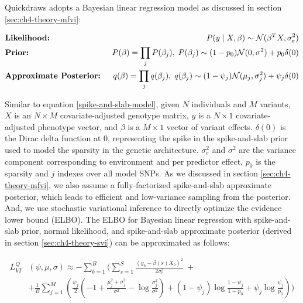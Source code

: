 Quickdraws adopts a Bayesian linear regression model as discussed in section \ref{sec:ch4-theory-mfvi}:

\begin{align}
    &\text{\textbf{Likelihood:} } &P(y \mid X, \beta) \sim \mathcal{N}(\beta^T X, \sigma_e^2) \nonumber \\
    &\text{\textbf{Prior:} } &P(\beta) = \prod_j P(\beta_j), \hspace{1mm} P(\beta_j) \sim (1-p_0)\mathcal{N} (0, \sigma ^ 2) + p_0 \delta(0) \nonumber \\
    &\text{\textbf{Approximate Posterior:} } &q(\beta) = \prod_j q(\beta_j), \hspace{1mm} q(\beta_j) \sim (1-\psi_j)\mathcal{N}(\mu_j, \sigma^2_j) + \psi_j \delta(0) \label{spike-and-slab-model2}
\end{align}

Similar to equation \ref{spike-and-slab-model}, given $N$ individuals and $M$ variants, $X$ is an $N \times M$ covariate-adjusted genotype matrix, $y$ is a $N \times 1$ covariate-adjusted phenotype vector, and $\beta$ is a $M \times 1$ vector of variant effects.
%
$\delta(0)$ is the Dirac delta function at 0, representing the spike in the spike-and-slab prior used to model the sparsity in the genetic architecture.
%
$\sigma_e^2$ and $\sigma^2$ are the variance component corresponding to environment and per predictor effect, $p_0$ is the sparsity and $j$ indexes over all model SNPs.
%
As we discussed in section \ref{sec:ch4-theory-mfvi}, we also assume a fully-factorized spike-and-slab approximate posterior, which leads to efficient and low-variance sampling from the posterior.
%
And, we use stochastic variational inference to directly optimize the evidence lower bound (ELBO).
%
The ELBO for Bayesian linear regression with spike-and-slab prior, normal likelihood, and spike-and-slab approximate posterior (derived in section \ref{sec:ch4-theory-svi}) can be approximated as follows: 

\begin{align}
    L^{Q}_{VI}&(\psi, \mu, \sigma) \approx - \sum\limits^{B}_{b=1} \Bigg( \sum\limits^{S}_{s=1} \frac{(y_b - \beta(s) X_b)^2}{2 \sigma_e^2} \ + \nonumber \\
    &+ \frac{1}{B}\sum\limits^{M}_{j=1} \left(  \frac{\psi_j}{2}\left(-1 + \frac{\mu_j^2 + \sigma_j^2}{\sigma^2} - \log \frac{\sigma_j^2}{\sigma^2} \right) + (1-\psi_j)\log\frac{1 - \psi_j}{1 - p_0} + \psi_j\log\frac{\psi_j}{p_0} \right) \Bigg) \label{elbo-loss}
\end{align}

